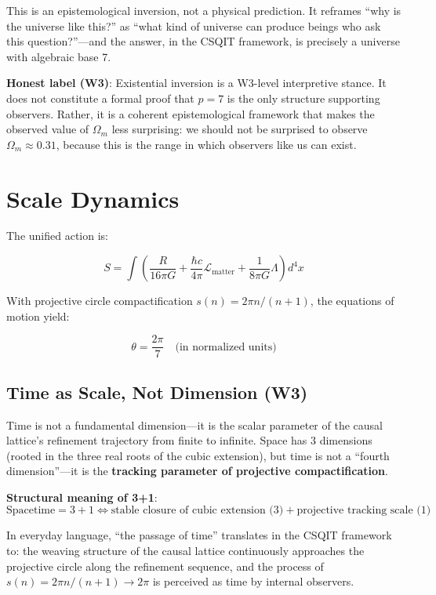 \documentclass[aps,prd,twocolumn,nofootinbib,floatfix]{revtex4-2}
\begin{document}
This is an epistemological inversion, not a physical prediction. It reframes ``why is the universe like this?'' as ``what kind of universe can produce beings who ask this question?''---and the answer, in the CSQIT framework, is precisely a universe with algebraic base 7.

\medskip
\noindent\textbf{Honest label (W3)}: Existential inversion is a W3-level interpretive stance. It does not constitute a formal proof that $p=7$ is the only structure supporting observers. Rather, it is a coherent epistemological framework that makes the observed value of $\Omega_m$ less surprising: we should not be surprised to observe $\Omega_m \approx 0.31$, because this is the range in which observers like us can exist.

\section{Scale Dynamics}

The unified action is:

\[
S = \int \left( \frac{R}{16\pi G} + \frac{\hbar c}{4\pi} \mathcal{L}_\text{matter} + \frac{1}{8\pi G} \Lambda \right) d^4x
\]

With projective circle compactification $s(n) = 2\pi n/(n+1)$, the equations of motion yield:

\[
\theta = \frac{2\pi}{7} \quad \text{(in normalized units)}
\]

\subsection*{Time as Scale, Not Dimension (W3)}

Time is not a fundamental dimension---it is the scalar parameter of the causal lattice's refinement trajectory from finite to infinite. Space has 3 dimensions (rooted in the three real roots of the cubic extension), but time is not a ``fourth dimension''---it is the \textbf{tracking parameter of projective compactification}.

\textbf{Structural meaning of 3+1}:
\[
\text{Spacetime} = 3 + 1 \iff \text{stable closure of cubic extension (3)} + \text{projective tracking scale (1)}
\]

In everyday language, ``the passage of time'' translates in the CSQIT framework to: the weaving structure of the causal lattice continuously approaches the projective circle along the refinement sequence, and the process of $s(n) = 2\pi n/(n+1) \to 2\pi$ is perceived as time by internal observers.
\end{document}
